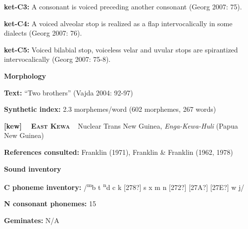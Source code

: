 \begin{styleBody}
\textbf{ket-C3: }A consonant is voiced preceding another consonant (Georg 2007: 75).
\end{styleBody}

\begin{styleBody}
\textbf{ket-C4: }A voiced alveolar stop is realized as a flap intervocalically in some dialects (Georg 2007: 76).
\end{styleBody}

\begin{styleBody}
\textbf{ket-C5: }Voiced bilabial stop, voiceless velar and uvular stops are spirantized intervocalically (Georg 2007: 75-8).
\end{styleBody}

\begin{styleBody}
\textbf{Morphology}
\end{styleBody}

\begin{styleBody}
\textbf{Text:} “Two brothers” (Vajda 2004: 92-97)
\end{styleBody}

\begin{styleBody}
\textbf{Synthetic index: }2.3 morphemes/word (602 morphemes, 267 words)
\end{styleBody}

\clearpage\begin{styleBody}
\textbf{[kew] }\ \ \textbf{\textsc{East Kewa}}\textbf{\ \ }Nuclear Trans New Guinea, \textit{Enga-Kewa-Huli} (Papua New Guinea)
\end{styleBody}

\begin{styleBody}
\textbf{References consulted: }Franklin (1971), Franklin \& Franklin (1962, 1978)
\end{styleBody}

\begin{styleBody}
\textbf{Sound inventory}
\end{styleBody}

\begin{styleBody}
\textbf{C phoneme inventory:} /\textsuperscript{m}b t \textsuperscript{n}d c k [278?] s x m n [272?] [27A?] [27E?] w j/
\end{styleBody}

\begin{styleBody}
\textbf{N consonant phonemes:} 15
\end{styleBody}

\begin{styleBody}
\textbf{Geminates:} N/A
\end{styleBody}

